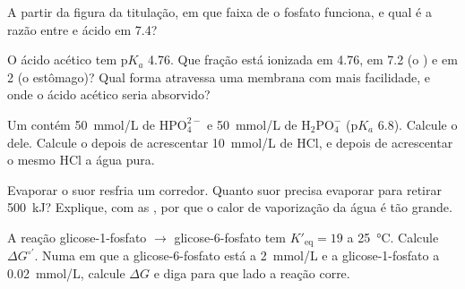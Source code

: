 \begin{exercise}[$\star$]\label{exo:b1:water-small-molecules:4}
A partir da figura da titulação, em que faixa de  o  fosfato
funciona, e qual é a razão entre  e ácido em  7.4?
\end{exercise}

\begin{exercise}[$\star\star$]\label{exo:b1:water-small-molecules:5}
O ácido acético tem p$K_a$ 4.76. Que fração está ionizada em  4.76, em
 7.2 (o ) e em  2 (o estômago)? Qual forma atravessa uma
membrana com mais facilidade, e onde o ácido acético seria absorvido?
\end{exercise}

\begin{exercise}[$\star\star$]\label{exo:b1:water-small-molecules:6}
Um  contém \qty{50}{mmol/L} de $\mathrm{HPO_4^{2-}}$ e
\qty{50}{mmol/L} de $\mathrm{H_2PO_4^-}$ (p$K_a$ 6.8). Calcule o 
dele. Calcule o  depois de acrescentar \qty{10}{mmol/L} de HCl, e
depois de acrescentar o mesmo HCl a água pura.
\end{exercise}

\begin{exercise}[$\star\star$]\label{exo:b1:water-small-molecules:7}
Evaporar o suor resfria um corredor. Quanto suor precisa evaporar para
retirar \qty{500}{kJ}? Explique, com as , por que
o calor de vaporização da água é tão grande.
\end{exercise}

\begin{exercise}[$\star\star$]\label{exo:b1:water-small-molecules:8}
A reação glicose-1-fosfato $\to$ glicose-6-fosfato tem
$K'_{\text{eq}} = 19$ a \qty{25}{\celsius}. Calcule
$\Delta G^{\circ\prime}$. Numa  em que a glicose-6-fosfato está a
\qty{2}{mmol/L} e a glicose-1-fosfato a \qty{0.02}{mmol/L}, calcule
$\Delta G$ e diga para que lado a reação corre.
\end{exercise}

